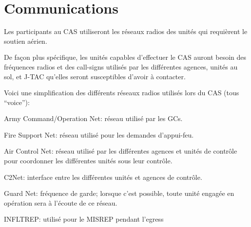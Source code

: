 \newpage

\chapter{Communications}

\e
    \item Les participants au CAS utiliseront les réseaux radios des unités qui requièrent le soutien aérien.
    \item
    De façon plus spécifique, les unités capables d’effectuer le CAS auront besoin des fréquences radios et des call-signs utilisés par les différentes agences, unités au sol, et J-TAC qu’elles seront susceptibles d’avoir à contacter.
    \item Voici une simplification des différents réseaux radios utilisés lors du CAS (tous ``voice''):
    \ee
        \item Army Command/Operation Net: réseau utilisé par les GCs.
        \item Fire Support Net: réseau utilisé pour les demandes d’appui-feu.
        \item Air Control Net: réseau utilisé par les différentes agences et unités de contrôle pour coordonner les différentes unités sous leur contrôle.
        \item C2Net: interface entre les différentes unités et agences de contrôle.
        \item Guard Net: fréquence de garde; lorsque c’est possible, toute unité engagée en opération sera à l’écoute de ce réseau.
        \item INFLTREP: utilisé pour le MISREP pendant l’egress
    \ed
\ed
